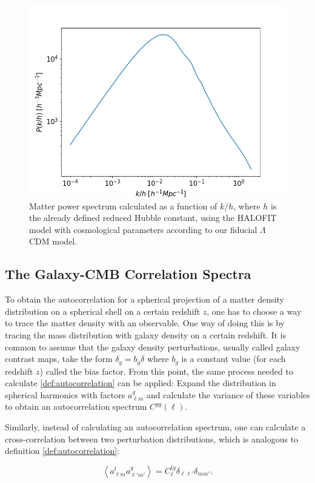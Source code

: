 \documentclass[openany,a4paper,12pt,oneside]{book}
\newcommand{\av}[1]{\left\langle #1 \right\rangle} %
\begin{document}
\begin{spacing}{1.5}
\begin{figure}[!htb]
    \centering
    \includegraphics[width=.75\linewidth]{Imagens/Pk_3dmatter_LCDM.png}
    \caption{Matter power spectrum calculated as a function of $k/h$, where $h$ is the already defined reduced Hubble constant, using the HALOFIT model with cosmological parameters according to our fiducial $\Lambda$CDM model.}
    \label{fig:matter_PS}
\end{figure}

\subsection{The Galaxy-CMB Correlation Spectra}\label{ch2:correlations}

To obtain the autocorrelation for a spherical projection of a matter density distribution on a spherical shell on a certain redshift $z$, one has to choose a way to trace the matter density with an observable. One way of doing this is by tracing the mass distribution with galaxy density on a certain redshift. It is common to assume that the galaxy density perturbations, usually called galaxy contrast maps, take the form $\delta_g=b_g\delta$ where $b_g$ is a constant value (for each redshift $z$) called the bias factor. From this point, the same process needed to calculate \eqref{def:autocorrelation} can be applied: Expand the distribution in spherical harmonics with factors $a_{\ell m}^g$ and calculate the variance of these variables to obtain an autocorrelation spectrum $C^{gg}(\ell)$.

Similarly, instead of calculating an autocorrelation spectrum, one can calculate a cross-correlation between two perturbation distributions, which is analogous to definition \eqref{def:autocorrelation}:

\begin{equation}\label{av(ag, at)}
    \av{a_{\ell m}^ta_{\ell' m'}^g}=C^{tg}_\ell\delta_{\ell \ell'}\delta_{mm'}.
\end{equation}


\end{spacing}
\end{document}
